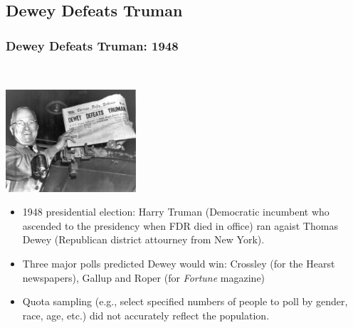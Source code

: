 \documentclass[t]{beamer}
\begin{document}
\subsection{Dewey Defeats Truman}
\begin{frame}
\frametitle{Dewey Defeats Truman: 1948}
{\ }\vspace{-20pt}

\begin{center}
\includegraphics[height=1.5in]{Dewey.eps}\vspace{-10pt}
\end{center}

\footnotesize
\begin{itemize}
\item 1948 presidential election:  Harry Truman (Democratic incumbent who 
   ascended to the presidency when FDR died in office) ran agaist 
  Thomas Dewey (Republican district attourney from New York).
\item Three major polls predicted Dewey would win: Crossley (for the Hearst newspapers), Gallup and Roper (for \textit{Fortune} magazine)
\item Quota sampling (e.g., select specified numbers of people to poll by gender, race, age, etc.)
   did not accurately reflect the population.
\end{itemize}

\end{frame}
\end{document}
